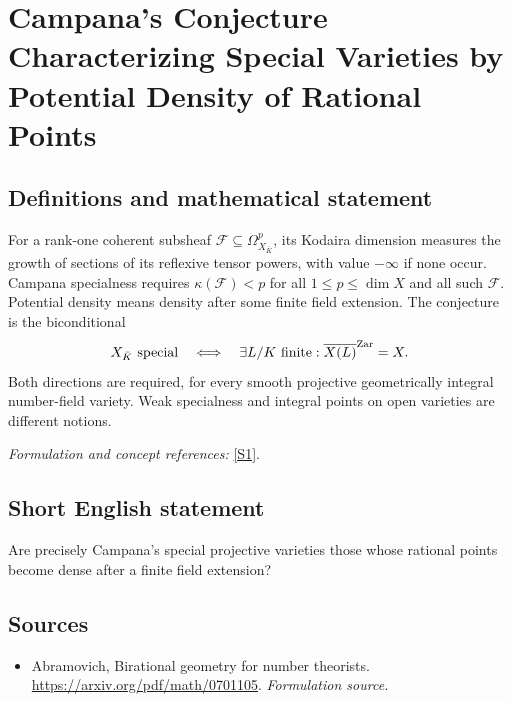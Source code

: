 \documentclass[11pt]{article}
\begin{document}
\section*{\texorpdfstring{Campana's Conjecture Characterizing Special Varieties by Potential Density of Rational Points}{Campana's Conjecture Characterizing Special Varieties by Potential Density of Rational Points}}\label{86}
\subsection{Definitions and mathematical statement}
For a rank-one coherent subsheaf $\mathcal F\subseteq\Omega^p_{X_{\bar K}}$, its Kodaira dimension measures the growth of sections of its reflexive tensor powers, with value $-\infty$ if none occur. Campana specialness requires $\kappa(\mathcal F)<p$ for all $1\le p\le\dim X$ and all such $\mathcal F$. Potential density means density after some finite field extension. The conjecture is the biconditional
\[
 X_{\bar K}\text{ special}\quad\Longleftrightarrow\quad
 \exists L/K\text{ finite}:\overline{X(L)}^{\rm Zar}=X.
\]
Both directions are required, for every smooth projective geometrically integral number-field variety. Weak specialness and integral points on open varieties are different notions.
\par\smallskip\textit{Formulation and concept references:} \href{https://arxiv.org/pdf/math/0701105}{[S1]}.

\subsection{Short English statement}
Are precisely Campana's special projective varieties those whose rational points become dense after a finite field extension?
\subsection{Sources}
\begin{itemize}
\item[S1]Abramovich, Birational geometry for number theorists.
\url{https://arxiv.org/pdf/math/0701105}.
\textit{Formulation source.}
\end{itemize}
\end{document}
